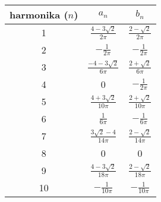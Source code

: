  \begin{center}
  \begin{tabular}{ c | c | c  }
    harmonika ($n$) & $a_n$ & $b_n$\\
  \hline
  1 & 
    $\frac{4 - 3 \sqrt{2}}{2 \pi}$ &
    $\frac{2 - \sqrt{2}}{2 \pi} $ \\
  2 & 
    $-\frac{1}{2\pi}$ &
    $-\frac{1}{2\pi}$ \\
  3 & 
    $\frac{-4 - 3 \sqrt{2}}{6 \pi}$ &
    $\frac{2 + \sqrt{2}}{6 \pi}$ \\
  4 &
    0 &
    $-\frac{1}{2 \pi}$ \\
  5 &
    $\frac{4 + 3 \sqrt{2}}{10 \pi}$ &
    $\frac{2 + \sqrt{2}}{10 \pi}$ \\
  6 &
    $\frac{1}{6 \pi}$ &
    $-\frac{1}{6 \pi}$ \\
  7 &
    $\frac{3 \sqrt{2} - 4}{14 \pi}$ &
    $ \frac{2 - \sqrt{2}}{14 \pi} $ \\
  8 & 0 & 0\\
  9 &
    $\frac{4 - 3 \sqrt{2}}{18 \pi}$ &
    $\frac{2 - \sqrt{2}}{18 \pi} $ \\
  10&
    $ -\frac{1}{10 \pi}$ &
    $ -\frac{1}{10 \pi}$ \\
  \end{tabular}
\end{center}




